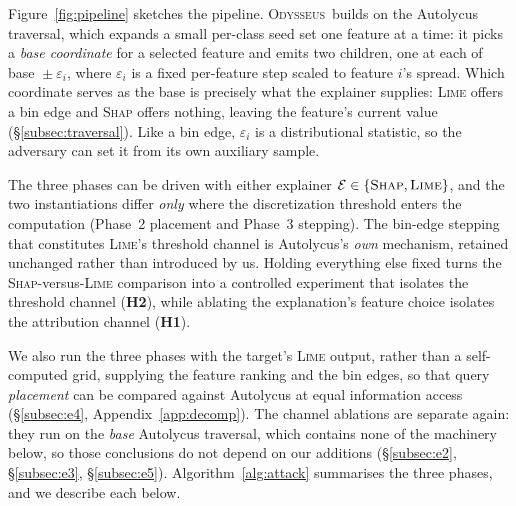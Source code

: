 \documentclass[sigconf,anonymous,review]{acmart}
\newcommand{\sys}{\textsc{Odysseus}}
\begin{document}
Figure~\ref{fig:pipeline} sketches the pipeline. \sys\ builds on the Autolycus traversal, which
expands a small per-class seed set one feature at a time: it picks a \emph{base coordinate} for a
selected feature and emits two children, one at each of base ${}\pm{}\varepsilon_i$, where
$\varepsilon_i$ is a fixed per-feature step scaled to feature $i$'s spread. Which coordinate serves
as the base is precisely what the explainer supplies: \textsc{Lime} offers a bin edge and
\textsc{Shap} offers nothing, leaving the feature's current value
(\S\ref{subsec:traversal}). Like a bin edge, $\varepsilon_i$ is a distributional statistic, so the
adversary can set it from its own auxiliary sample.

The three phases can be driven with either explainer $\mathcal{E} \in \{\textsc{Shap},
\textsc{Lime}\}$, and the two instantiations differ \emph{only} where the discretization threshold
enters the computation (Phase~2 placement and Phase~3 stepping). The bin-edge stepping that
constitutes \textsc{Lime}'s threshold channel is Autolycus's \emph{own} mechanism, retained unchanged
rather than introduced by us. Holding everything else fixed turns the
\textsc{Shap}-versus-\textsc{Lime} comparison into a controlled experiment that isolates the threshold
channel (\textbf{H2}), while ablating the explanation's feature choice isolates the attribution
channel (\textbf{H1}).

We also run the three phases with the target's \textsc{Lime} output, rather than a self-computed grid,
supplying the feature ranking and the bin edges, so that query \emph{placement} can be compared
against Autolycus at equal information access (\S\ref{subsec:e4}, Appendix~\ref{app:decomp}). The
channel ablations are separate again: they run on the \emph{base} Autolycus traversal, which contains
none of the machinery below, so those conclusions do not depend on our additions
(\S\ref{subsec:e2}, \S\ref{subsec:e3}, \S\ref{subsec:e5}). Algorithm~\ref{alg:attack} summarises the
three phases, and we describe each below.
\end{document}
